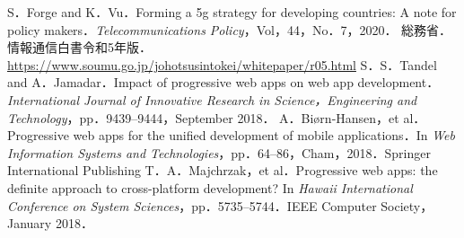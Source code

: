 \begin{multicols*}{2}
\begin{thebibliography}{9}
 S．Forge and K．Vu．Forming a 5g strategy for developing countries: A note for policy makers．\textit{Telecommunications Policy}，Vol，44，No．7，2020．
 総務省．情報通信白書令和5年版．\url{https://www.soumu.go.jp/johotsusintokei/whitepaper/r05.html}
 S．S．Tandel and A．Jamadar．Impact of progressive web apps on web app development．\textit{International Journal of Innovative Research in Science，Engineering and Technology}，pp．9439–9444，September 2018．
 A．Biørn-Hansen，et al．Progressive web apps for the unified development of mobile applications．In \textit{Web Information Systems and Technologies}，pp．64–86，Cham，2018．Springer International Publishing
 T．A．Majchrzak，et al．Progressive web apps: the definite approach to cross-platform development? In \textit{Hawaii International Conference on System Sciences}，pp．5735–5744．IEEE Computer Society，January 2018．
\end{thebibliography}
\end{multicols*} 



